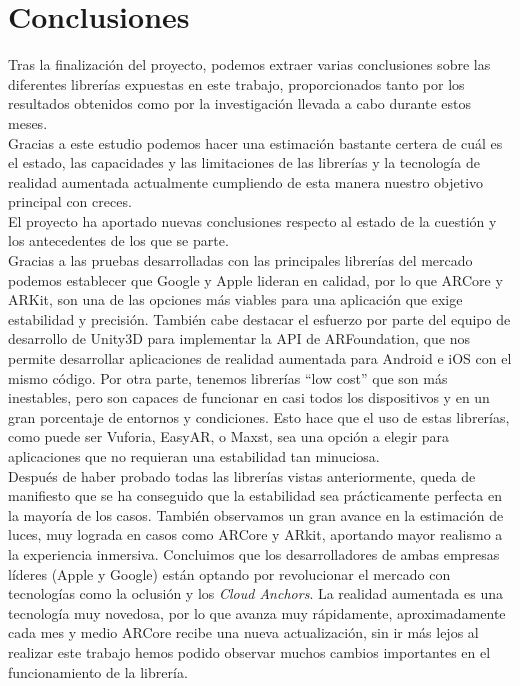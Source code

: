 \chapter*{Conclusiones}

Tras la finalización del proyecto, podemos extraer varias conclusiones sobre las diferentes librerías expuestas en este trabajo, proporcionados tanto por los resultados obtenidos como por la investigación llevada a cabo durante estos meses.\\

Gracias a este estudio podemos hacer una estimación bastante certera de cuál es el estado, las capacidades y las limitaciones de las librerías y la tecnología de realidad aumentada actualmente cumpliendo de esta manera nuestro objetivo principal con creces.\\

El proyecto ha aportado nuevas conclusiones respecto al estado de la cuestión y los antecedentes de los que se parte.\\

Gracias a las pruebas desarrolladas con las principales librerías del mercado podemos establecer que Google y Apple lideran en calidad, por lo que ARCore y ARKit, son una de las opciones más viables para una aplicación que exige estabilidad y precisión. También cabe destacar el esfuerzo por parte del equipo de desarrollo de Unity3D para implementar la API de ARFoundation, que nos permite desarrollar aplicaciones de realidad aumentada para Android e iOS con el mismo código. 
Por otra parte, tenemos librerías ``low cost'' que son más inestables, pero son capaces de funcionar en casi todos los dispositivos \cite{wikitudeInstant} y en un gran porcentaje de entornos y condiciones. Esto hace que el uso de estas librerías, como puede ser Vuforia, EasyAR, o Maxst, sea una opción a elegir para aplicaciones que no requieran una estabilidad tan minuciosa.\\

Después de haber probado todas las librerías vistas anteriormente, queda de manifiesto que se ha conseguido que la estabilidad sea prácticamente perfecta en la mayoría de los casos. También observamos un gran avance en la estimación de luces, muy lograda en casos como ARCore y ARkit, aportando mayor realismo a la experiencia inmersiva. Concluimos que los desarrolladores de ambas empresas líderes (Apple y Google) están optando por revolucionar el mercado con tecnologías como la oclusión y los \textit{Cloud Anchors}. La realidad aumentada es una tecnología muy novedosa, por lo que avanza muy rápidamente, aproximadamente cada mes y medio ARCore recibe una nueva actualización, sin ir más lejos al realizar este trabajo hemos podido observar muchos cambios importantes en el funcionamiento de la librería.\\

